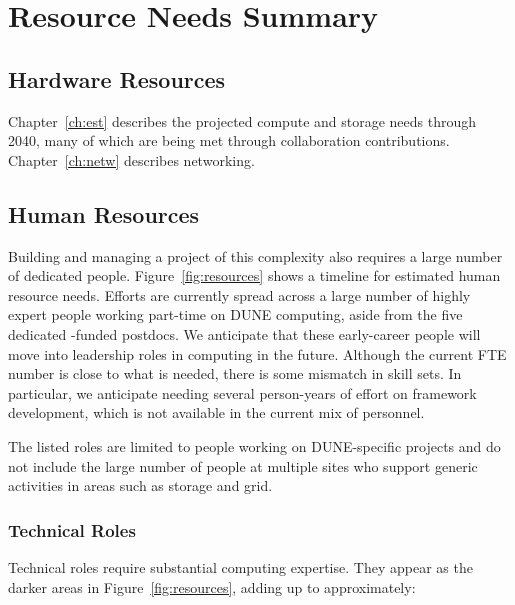 \documentclass[../main-v1.tex]{subfiles}
\begin{document}
\chapter{Resource Needs Summary}
\label{ch:resource}

\section{Hardware Resources}
Chapter~\ref{ch:est} describes the projected compute and storage needs through 2040, many of which are being met through collaboration contributions. Chapter~\ref{ch:netw} describes networking. 



\section{%
Human Resources} %
Building and managing a project of this complexity also requires a large number of %
dedicated people.  Figure~\ref{fig:resources} shows a timeline for estimated human resource needs.   Efforts are currently spread across a large number of highly expert people working part-time on DUNE computing, aside from the five dedicated -funded postdocs.  We anticipate that these early-career people will move into leadership roles in computing in the future.  Although the current FTE %
number is close to %
what is needed, there is some mismatch in skill sets. In particular, we anticipate needing several person-years of effort on framework development, which is not available in the current mix of personnel.

The listed roles are limited to people working on DUNE-specific projects and do not include the large number of people at multiple sites who support generic activities in areas such as storage and grid.  


\subsection{Technical Roles}
\label{subsec:coll-org:Tech}

Technical roles require substantial computing expertise.  They appear as the darker areas in Figure~\ref{fig:resources}, adding up to approximately: 
\end{document}
